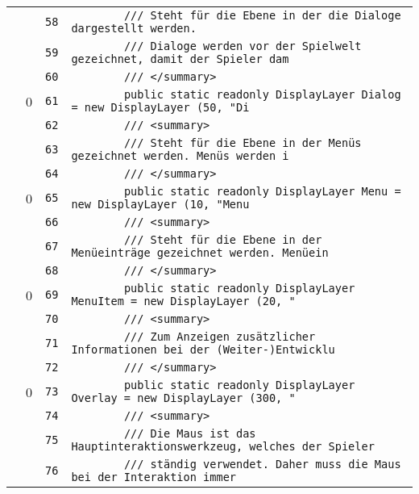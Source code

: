 \documentclass[a4paper,10pt]{article}
\begin{document}
\begin{longtable}[l]{lrrl}
\cellcolor{gray} &  & \verb~58~ & \verb~        /// Steht für die Ebene in der die Dialoge dargestellt werden.~\\
\cellcolor{gray} &  & \verb~59~ & \verb~        /// Dialoge werden vor der Spielwelt gezeichnet, damit der Spieler dam~\\
\cellcolor{gray} &  & \verb~60~ & \verb~        /// </summary>~\\
\cellcolor{red} & 0 & \verb~61~ & \verb~        public static readonly DisplayLayer Dialog = new DisplayLayer (50, "Di~\\
\cellcolor{gray} &  & \verb~62~ & \verb~        /// <summary>~\\
\cellcolor{gray} &  & \verb~63~ & \verb~        /// Steht für die Ebene in der Menüs gezeichnet werden. Menüs werden i~\\
\cellcolor{gray} &  & \verb~64~ & \verb~        /// </summary>~\\
\cellcolor{red} & 0 & \verb~65~ & \verb~        public static readonly DisplayLayer Menu = new DisplayLayer (10, "Menu~\\
\cellcolor{gray} &  & \verb~66~ & \verb~        /// <summary>~\\
\cellcolor{gray} &  & \verb~67~ & \verb~        /// Steht für die Ebene in der Menüeinträge gezeichnet werden. Menüein~\\
\cellcolor{gray} &  & \verb~68~ & \verb~        /// </summary>~\\
\cellcolor{red} & 0 & \verb~69~ & \verb~        public static readonly DisplayLayer MenuItem = new DisplayLayer (20, "~\\
\cellcolor{gray} &  & \verb~70~ & \verb~        /// <summary>~\\
\cellcolor{gray} &  & \verb~71~ & \verb~        /// Zum Anzeigen zusätzlicher Informationen bei der (Weiter-)Entwicklu~\\
\cellcolor{gray} &  & \verb~72~ & \verb~        /// </summary>~\\
\cellcolor{red} & 0 & \verb~73~ & \verb~        public static readonly DisplayLayer Overlay = new DisplayLayer (300, "~\\
\cellcolor{gray} &  & \verb~74~ & \verb~        /// <summary>~\\
\cellcolor{gray} &  & \verb~75~ & \verb~        /// Die Maus ist das Hauptinteraktionswerkzeug, welches der Spieler~\\
\cellcolor{gray} &  & \verb~76~ & \verb~        /// ständig verwendet. Daher muss die Maus bei der Interaktion immer~\\

\end{longtable}
\end{document}
